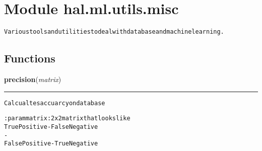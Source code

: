 %
%
%


\section{Module hal.ml.utils.misc}

    \label{hal:ml:utils:misc}
\begin{alltt}
Various tools and utilities to deal with database and machine learning. 
\end{alltt}



  \subsection{Functions}

    \label{hal:ml:utils:misc:precision}

    \vspace{0.5ex}

\hspace{.8\funcindent}\begin{boxedminipage}{\funcwidth}

    \raggedright \textbf{precision}(\textit{matrix})

    \vspace{-1.5ex}

    \rule{\textwidth}{0.5\fboxrule}
\setlength{\parskip}{2ex}
\begin{alltt}
Calcualtes accuarcy on database

:param matrix: 2x2 matrix that looks like
True Positive  - False Negative
     {\textbar}         -       {\textbar}
False Positive - True Negative
\end{alltt}

\setlength{\parskip}{1ex}
    \end{boxedminipage}

